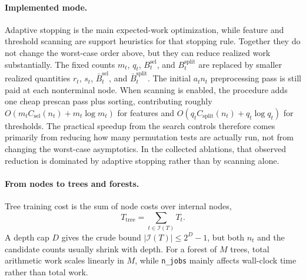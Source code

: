 \paragraph{Implemented mode.}
Adaptive stopping is the main expected-work optimization, while feature and
threshold scanning are support heuristics for that stopping rule. Together they
do not change the worst-case order above, but they can reduce realized work
substantially. The fixed counts $m_t$, $q_t$, $B_t^{\mathrm{sel}}$, and
$B_t^{\mathrm{split}}$ are replaced by smaller realized quantities $r_t$,
$s_t$, $\bar B_t^{\mathrm{sel}}$, and $\bar B_t^{\mathrm{split}}$. The initial
$a_t n_t$ preprocessing pass is still paid at each nonterminal node. When
scanning is enabled, the procedure adds one cheap prescan pass plus sorting,
contributing roughly
$O(m_t C_{\mathrm{sel}}(n_t) + m_t \log m_t)$ for features and
$O(q_t C_{\mathrm{split}}(n_t) + q_t \log q_t)$ for thresholds. The practical
speedup from the search controls therefore comes primarily from reducing how
many permutation tests are actually run, not from changing the worst-case
asymptotics. In the collected ablations, that observed reduction is dominated
by adaptive stopping rather than by scanning alone.

\paragraph{From nodes to trees and forests.}
Tree training cost is the sum of node costs over internal nodes,
%
\begin{equation}
  T_{\mathrm{tree}} = \sum_{t \in \mathcal{I}(T)} T_t.
\end{equation}
%
A depth cap $D$ gives the crude bound $|\mathcal{I}(T)| \le 2^D - 1$, but both
$n_t$ and the candidate counts usually shrink with depth. For a
forest of $M$ trees, total arithmetic work scales linearly in $M$, while
\texttt{n\_jobs} mainly affects wall-clock time rather than total work.

